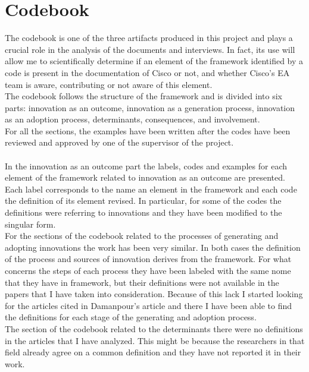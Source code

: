 \section{Codebook}
The codebook is one of the three artifacts produced in this project and plays a crucial role in the analysis of the documents and interviews.
In fact, its use will allow me to scientifically determine if an element of the framework identified by a code is present in the documentation of Cisco or not, and whether Cisco's EA team is aware, contributing or not aware of this element. \\
The codebook follows the structure of the framework and is divided into six parts: innovation as an outcome, innovation as a generation process, innovation as an adoption process, determinants, consequences, and involvement. \\
For all the sections, the examples have been written after the codes have been reviewed and approved by one of the supervisor of the project.
\\ \\ %
In the innovation as an outcome part the labels, codes and examples for each element of the framework related to innovation as an outcome are presented. Each label corresponds to the name an element in the framework and each code the definition of its element revised. In particular, for some of the codes the definitions were referring to innovations and they have been modified to the singular form.
\\ %
For the sections of the codebook related to the processes of generating and adopting innovations the work has been very similar. In both cases the definition of the process and sources of innovation derives from the framework.
For what concerns the steps of each process they have been labeled with the same nome that they have in framework, but their definitions were not available in the papers that I have taken into consideration. Because of this lack I started looking for the articles cited in Damanpour's article \citep{damanpour2006} and there I have been able to find the definitions for each stage of the generating and adoption process. %
\\ %
The section of the codebook related to the determinants there were no definitions in the articles that I have analyzed. This might be because the researchers in that field already agree on a common definition and they have not reported it in their work.
